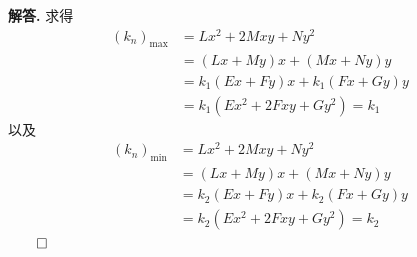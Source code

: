 \documentclass[12pt, a4paper, oneside]{ctexart}
\newenvironment{solution}{\par\noindent\textbf{解答. }}{\hfill$\qed$\par}
\begin{document}
\begin{solution}
		求得\[ \begin{aligned}
			(k_{n})_{\mathrm{max}} &= Lx^{2}+2Mxy + Ny^{2}\\ &= (Lx + My)x + (Mx + Ny)y\\ &= k_{1}(Ex+Fy)x + k_{1}(Fx+Gy)y \\&= k_{1}(Ex^{2}+2Fxy+Gy^{2}) = k_{1}
		\end{aligned} \]
		以及\[ \begin{aligned}
			(k_{n})_{\mathrm{min}} &= Lx^{2}+2Mxy + Ny^{2}\\ &= (Lx + My)x + (Mx + Ny)y\\ &= k_{2}(Ex+Fy)x + k_{2}(Fx+Gy)y \\&= k_{2}(Ex^{2}+2Fxy+Gy^{2}) = k_{2}
		\end{aligned} \]
	\end{solution}
	
\end{document}
